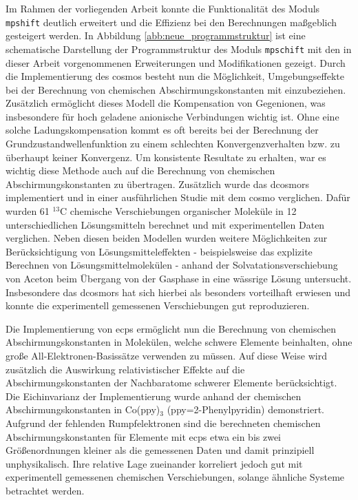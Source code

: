 Im Rahmen der vorliegenden Arbeit konnte die Funktionalität des Moduls \texttt{mpshift} deutlich erweitert und die Effizienz bei den Berechnungen maßgeblich gesteigert werden. In Abbildung \ref{abb:neue_programmstruktur} ist eine schematische Darstellung der Programmstruktur des Moduls \texttt{mpschift} mit den in dieser Arbeit vorgenommenen Erweiterungen und Modifikationen gezeigt. Durch die Implementierung des \acfp{cosmo} besteht nun die Möglichkeit, Umgebungseffekte bei der Berechnung von chemischen Abschirmungskonstanten mit einzubeziehen. Zusätzlich ermöglicht dieses Modell die Kompensation von Gegenionen, was insbesondere für hoch geladene anionische Verbindungen wichtig ist. Ohne eine solche Ladungskompensation kommt es oft bereits bei der Berechnung der Grundzustandwellenfunktion zu einem schlechten Konvergenzverhalten bzw. zu überhaupt keiner Konvergenz. Um konsistente Resultate zu erhalten, war es wichtig diese Methode auch auf die Berechnung von chemischen Abschirmungskonstanten zu übertragen. Zusätzlich wurde das \acf{dcosmors} implementiert und in einer ausführlichen Studie mit dem \ac{cosmo} verglichen. Dafür wurden 61 $^{13}$C chemische Verschiebungen organischer Moleküle in 12 unterschiedlichen Lösungsmitteln berechnet und mit experimentellen Daten verglichen. Neben diesen beiden Modellen wurden weitere Möglichkeiten zur Berücksichtigung von Lösungsmitteleffekten - beispielsweise das explizite Berechnen von Lösungsmittelmolekülen - anhand der Solvatationsverschiebung von Aceton beim Übergang von der Gasphase in eine wässrige Lösung untersucht. Insbesondere das \ac{dcosmors} hat sich hierbei als besonders vorteilhaft erwiesen und konnte die experimentell gemessenen Verschiebungen gut reproduzieren. 

Die Implementierung von \acfp{ecp} ermöglicht nun die Berechnung von chemischen Abschirmungskonstanten in Molekülen, welche schwere Elemente beinhalten, ohne große All-Elektronen-Basissätze verwenden zu müssen. Auf diese Weise wird zusätzlich die Auswirkung relativistischer Effekte auf die Abschirmungskonstanten der Nachbaratome schwerer Elemente berücksichtigt. Die Eichinvarianz der Implementierung wurde anhand der chemischen Abschirmungskonstanten in Co(ppy)$_3$ (ppy=2-Phenylpyridin) demonstriert. Aufgrund der fehlenden Rumpfelektronen sind die berechneten chemischen Abschirmungskonstanten für Elemente mit \acp{ecp} etwa ein bis zwei Größenordnungen kleiner als die gemessenen Daten und damit prinzipiell unphysikalisch. Ihre relative Lage zueinander korreliert jedoch gut mit experimentell gemessenen chemischen Verschiebungen, solange ähnliche Systeme betrachtet werden.

